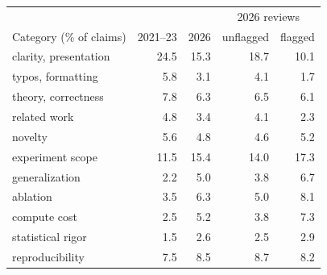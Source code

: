 \setlength{\tabcolsep}{3pt}\begin{tabular}{lrrrr}
\toprule
& & & \multicolumn{2}{c}{2026 reviews} \\
Category (\% of claims) & 2021--23 & 2026 & unflagged & flagged \\
\midrule
clarity, presentation & 24.5 & 15.3 & 18.7 & 10.1 \\
typos, formatting & 5.8 & 3.1 & 4.1 & 1.7 \\
theory, correctness & 7.8 & 6.3 & 6.5 & 6.1 \\
related work & 4.8 & 3.4 & 4.1 & 2.3 \\
novelty & 5.6 & 4.8 & 4.6 & 5.2 \\
experiment scope & 11.5 & 15.4 & 14.0 & 17.3 \\
generalization & 2.2 & 5.0 & 3.8 & 6.7 \\
ablation & 3.5 & 6.3 & 5.0 & 8.1 \\
compute cost & 2.5 & 5.2 & 3.8 & 7.3 \\
statistical rigor & 1.5 & 2.6 & 2.5 & 2.9 \\
reproducibility & 7.5 & 8.5 & 8.7 & 8.2 \\
\bottomrule
\end{tabular}
